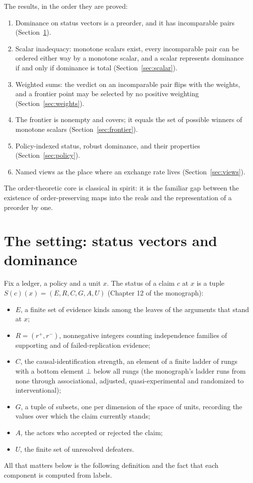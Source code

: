 \documentclass[11pt]{article}
\theoremstyle{plain}
\theoremstyle{definition}
\theoremstyle{remark}
\begin{document}
The results, in the order they are proved:
\begin{enumerate}[label=(R\arabic*),nosep]
\item Dominance on status vectors is a preorder, and it has incomparable pairs (Section~\ref{sec:setting}).
\item Scalar inadequacy: monotone scalars exist, every incomparable pair can be ordered either way by a monotone scalar, and a scalar represents dominance if and only if dominance is total (Section~\ref{sec:scalar}).
\item Weighted sums: the verdict on an incomparable pair flips with the weights, and a frontier point may be selected by no positive weighting (Section~\ref{sec:weights}).
\item The frontier is nonempty and covers; it equals the set of possible winners of monotone scalars (Section~\ref{sec:frontier}).
\item Policy-indexed status, robust dominance, and their properties (Section~\ref{sec:policy}).
\item Named views as the place where an exchange rate lives (Section~\ref{sec:views}).
\end{enumerate}
The order-theoretic core is classical in spirit: it is the familiar gap between the existence of order-preserving maps into the reals and the representation of a preorder by one.


\section{The setting: status vectors and dominance}\label{sec:setting}

Fix a ledger, a policy and a unit $x$. The status of a claim $c$ at $x$ is a tuple $S(c)(x)=(E,R,C,G,A,U)$ (Chapter 12 of the monograph):
\begin{itemize}[nosep]
\item $E$, a finite set of evidence kinds among the leaves of the arguments that stand at $x$;
\item $R=(r^+,r^-)$, nonnegative integers counting independence families of supporting and of failed-replication evidence;
\item $C$, the causal-identification strength, an element of a finite ladder of rungs with a bottom element $\bot$ below all rungs (the monograph's ladder runs from \textsf{none} through \textsf{associational}, \textsf{adjusted}, \textsf{quasi-experimental} and \textsf{randomized} to \textsf{interventional});
\item $G$, a tuple of subsets, one per dimension of the space of units, recording the values over which the claim currently stands;
\item $A$, the actors who accepted or rejected the claim;
\item $U$, the finite set of unresolved defeaters.
\end{itemize}
All that matters below is the following definition and the fact that each component is computed from labels.
\end{document}
